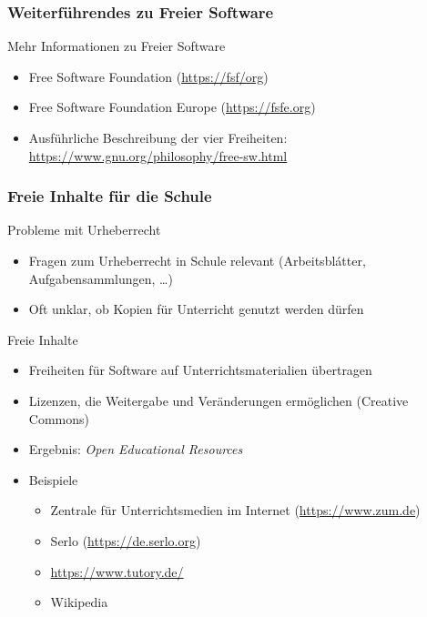 \documentclass{beamer}
\begin{document}
\begin{frame}
  \frametitle{Weiterführendes zu Freier Software}

  \onslide<+->

  \begin{block}{Mehr Informationen zu Freier Software}
    \begin{itemize}
    \item Free Software Foundation (\url{https://fsf/org})
    \item Free Software Foundation Europe (\url{https://fsfe.org})
    \item Ausführliche Beschreibung der vier Freiheiten:
      \url{https://www.gnu.org/philosophy/free-sw.html}
    \end{itemize}
  \end{block}

\end{frame}


\begin{frame}
  \frametitle{Freie Inhalte für die Schule}

  \onslide<+->

  \begin{block}{Probleme mit Urheberrecht}
    \begin{itemize}
    \item Fragen zum Urheberrecht in Schule relevant (Arbeitsblátter,
      Aufgabensammlungen, \dots)
    \item Oft unklar, ob Kopien für Unterricht genutzt werden dürfen
    \end{itemize}
  \end{block}

  \onslide<+->

  \begin{block}{Freie Inhalte}
    \begin{itemize}
    \item Freiheiten für Software auf Unterrichtsmaterialien übertragen
    \item Lizenzen, die Weitergabe und Veränderungen ermöglichen (Creative
      Commons)
    \item Ergebnis: \emph{Open Educational Resources}
    \item Beispiele
      \begin{itemize}
      \item Zentrale für Unterrichtsmedien im Internet
        (\url{https://www.zum.de})
      \item Serlo (\url{https://de.serlo.org})
      \item \url{https://www.tutory.de/}
      \item Wikipedia
      \end{itemize}
    \end{itemize}
  \end{block}

\end{frame}
\end{document}
